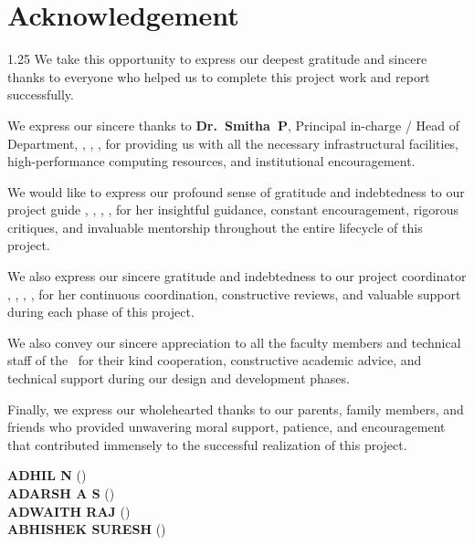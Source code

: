 \chapter*{Acknowledgement}%
%
\vspace{-15pt}

\begin{spacing}{1.25}
\noindent We take this opportunity to express our deepest gratitude and sincere thanks to everyone who helped us to complete this project work and report successfully.

\vspace{6pt}

\noindent We express our sincere thanks to \mbox{\textbf{Dr.~Smitha P}}, Principal in-charge / Head of Department, \dept, \college, \collegeplace, for providing us with all the necessary infrastructural facilities, high-performance computing resources, and institutional encouragement.

\vspace{6pt}

\noindent We would like to express our profound sense of gratitude and indebtedness to our project guide \mbox{\textbf{\guide}}, \guidedes, \dept, \college, for her insightful guidance, constant encouragement, rigorous critiques, and invaluable mentorship throughout the entire lifecycle of this project.

\vspace{6pt}

\noindent We also express our sincere gratitude and indebtedness to our project coordinator \mbox{\textbf{\coordinator}}, \coordinatordes, \dept, \college, for her continuous coordination, constructive reviews, and valuable support during each phase of this project.

\vspace{6pt}

\noindent We also convey our sincere appreciation to all the faculty members and technical staff of the \dept\ for their kind cooperation, constructive academic advice, and technical support during our design and development phases.

\vspace{6pt}

\noindent Finally, we express our wholehearted thanks to our parents, family members, and friends who provided unwavering moral support, patience, and encouragement that contributed immensely to the successful realization of this project.

\vspace*{14pt}
\begin{flushright}
	\textbf{ADHIL N} (\rollnoA) \\[3pt]
	\textbf{ADARSH A S} (\rollnoB) \\[3pt]
	\textbf{ADWAITH RAJ} (\rollnoC) \\[3pt]
	\textbf{ABHISHEK SURESH} (\rollnoD)
\end{flushright}
\end{spacing}

\thispagestyle{plain}
